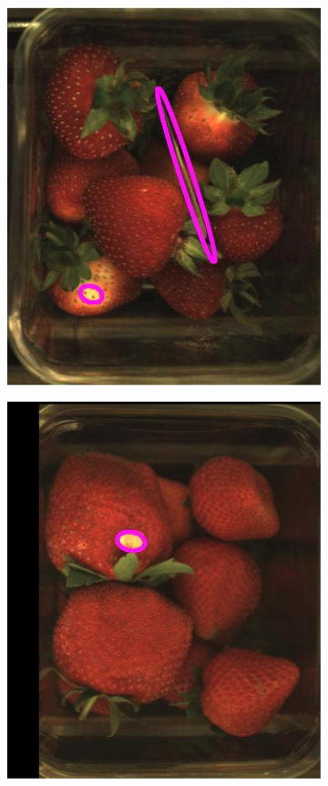 \documentclass[fleqn,twoside,12pt]{report}
\begin{document}
  
\begin{figure}[h]
	\centering
	\begin{subfigure}{.25\textwidth}
		\centering
		\includegraphics[width=.9\linewidth]{fo_1.jpg}
		\caption{}
		\label{fig:fo_1}
	\end{subfigure}%
	\begin{subfigure}{.25\textwidth}
		\centering
		\includegraphics[width=.9\linewidth]{fo_2.jpg}

\end{subfigure}
\end{figure}
\end{document}
